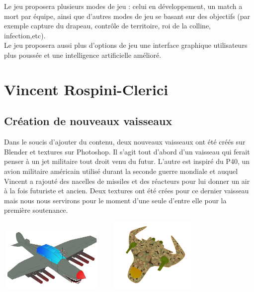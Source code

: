 \documentclass[10pt, titlepage]{report}
\begin{document}
Le jeu proposera plusieurs modes de jeu : celui en développement, un match a mort par équipe, ainsi que d'autres modes de jeu se basant sur des objectifs (par exemple capture du drapeau, contrôle de territoire, roi de la colline, infection,etc).\\

Le jeu proposera aussi plus d'options de jeu une interface graphique utilisateurs plus poussée et une intelligence artificielle amélioré.\\

\section{Vincent Rospini-Clerici}

\subsection{Création de nouveaux vaisseaux}
Dans le soucis d'ajouter du contenu, deux nouveaux vaisseaux ont été créés sur Blender et textures sur Photoshop. Il s'agit tout d'abord d'un vaisseau qui ferait penser à un jet militaire tout droit venu du futur. L'autre est inspiré du P40, un avion militaire américain utilisé durant la seconde guerre mondiale et auquel Vincent a rajouté des nacelles de missiles et des réacteurs pour lui donner un air à la fois futuriste et ancien. Deux textures ont été crées pour ce dernier vaisseau mais nous nous servirons pour le moment d'une seule d'entre elle pour la première soutenance.\\

\begin{center}
\includegraphics[height=3cm, width=5cm]{sharknado.png}
\includegraphics[height=3.5cm, width=5.5cm]{vaisseaumilitaire.png}
\end{center}
\end{document}
